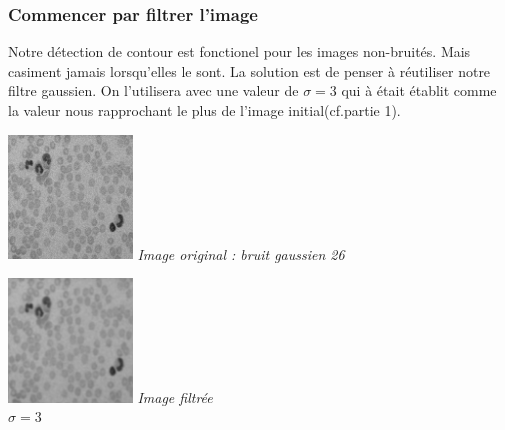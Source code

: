 \documentclass[a4,12pt]{article}
\begin{document}
\subsubsection{Commencer par filtrer l'image}
Notre détection de contour est fonctionel pour les images non-bruités.
Mais casiment jamais lorsqu'elles le sont. La solution est de penser à réutiliser notre filtre gaussien.
On l'utilisera avec une valeur de $\sigma=3$ qui à était établit comme la valeur nous rapprochant le plus de l'image initial(cf.partie 1).\\

\noindent
\begin{center}
\begin{minipage}[c]{0.20\linewidth}
	\begin{center}
		\includegraphics[width = 33mm]{./img/globulesbb26.jpg}
		\textit{Image original : bruit gaussien 26}
	\end{center}
\end{minipage}
\begin{minipage}[c]{0.20\linewidth}
	\begin{center}
		\includegraphics[width = 33mm]{./img/globulesbb26_filtrer3.jpg}
		\textit{Image filtrée \\ $\sigma=3$}
	\end{center}
\end{minipage}
\end{center}
\end{document}
